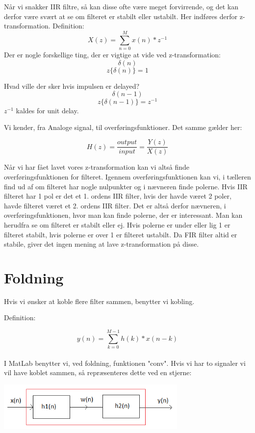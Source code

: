 \documentclass[12pt, letterpaper]{article}
\begin{document}
Når vi snakker IIR filtre, så kan disse ofte være meget forvirrende, og det kan derfor være svært at se om filteret er stabilt eller ustabilt. Her indføres derfor z-transformation. 
Definition: 
$$ X(z)= \sum\limits_{n=0}^{M} x(n)*z^{-1}$$
Der er nogle forskellige ting, der er vigtige at vide ved z-transformation: 
$$\delta(n)$$
$$ z{\{\delta(n)}\}=1$$

Hvad ville der sker hvis impulsen er delayed? 
$$\delta(n-1)$$
$$ z{\{\delta(n-1)}\}=z^{-1}$$
$z^{-1}$ kaldes for unit delay. 

Vi kender, fra Analoge signal, til overføringsfunktioner. Det samme gælder her: 

$$ H(z)= \frac{output}{input} = \frac{Y(z)}{X(z)}$$

Når vi har fået lavet vores z-transformation kan vi altså finde overføringsfunktionen for filteret. 
Igennem overføringsfunktionen kan vi, i tælleren find ud af om filteret har nogle nulpunkter og i nævneren finde polerne. 
Hvis IIR filteret har 1 pol er det et 1. ordens IIR filter, hvis der havde været 2 poler, havde filteret været et 2. ordens IIR filter. Det er altså derfor nævneren, i overføringsfunktionen, hvor man kan finde polerne, der er interessant. Man kan herudfra se om filteret er stabilt eller ej. Hvis polerne er under eller lig 1 er filteret stabilt, hvis polerne er over 1 er filteret ustabilt. 
Da FIR filter altid er stabile, giver det ingen mening at lave z-transformation på disse. 


\section{Foldning}
Hvis vi ønsker at koble flere filter sammen, benytter vi kobling. 

Definition: 

$$ y(n)= \sum\limits_{k=0}^{M-1} h(k) * x(n-k) $$ \\

I MatLab benytter vi, ved foldning, funktionen "conv". 
Hvis vi har to signaler vi vil have koblet sammen, så repræsenteres dette ved en stjerne: 

\begin{center}
\includegraphics[width=0.7\textwidth]{billeder/foldning}
\end{center}
\end{document}
